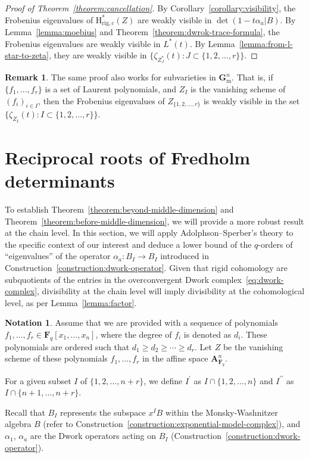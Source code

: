 \documentclass{amsart}
\numberwithin{equation}{section}
\theoremstyle{plain}
\theoremstyle{definition}
\newtheorem{notation}[equation]{Notation}
\newtheorem{remark}[equation]{Remark}
\renewcommand{\mathbb}{\mathbf}
\begin{document}
\begin{proof}[Proof of Theorem~\ref{theorem:cancellation}]
  By Corollary~\ref{corollary:visibility},
  the Frobenius eigenvalues of \(\mathrm{H}^{\ast}_{\mathrm{rig},c}(Z)\)
  are weakly visible in \(\det(1-t\alpha_{a}| B)\).
  By Lemma~\ref{lemma:moebius} and Theorem~\ref{theorem:dwrok-trace-formula},
  the Frobenius eigenvalues are weakly visible in \(L^{\ast}(t)\).
  By Lemma~\ref{lemma:from-l-star-to-zeta},
  they are weakly visible in
  \(\{\zeta_{Z_J^*}(t) : J \subset \{1,2,\ldots,r\}\}\).
\end{proof}

\begin{remark}
  The same proof also works for subvarieties in \(\mathbb{G}_{\mathrm{m}}^{n}\).
  That is, if \(\{f_1,\ldots,f_r\}\) is a set of Laurent polynomials, and
  \(Z_{I}\) is the vanishing scheme of \((f_i)_{i\in I}\),
  then the Frobenius eigenvalues of \(Z_{\{1,2,\ldots,r\}}\) is weakly visible
  in the set \(\{\zeta_{Z_I}(t): I\subset \{1,2,\ldots,r\}\}\).
\end{remark}



\section{Reciprocal roots of Fredholm determinants}
\label{sec:artin-hasse}

To establish Theorem~\ref{theorem:beyond-middle-dimension} and
Theorem~\ref{theorem:before-middle-dimension}, we will provide a more
robust result at the chain level.  In this section, we will apply
Adolphson--Sperber's theory to the specific context of our interest
and deduce a lower bound of the \(q\)-orders of ``eigenvalues'' of the operator
\(\alpha_{a}\colon B_{I} \to B_{I}\) introduced in
Construction~\ref{construction:dwork-operator}.  Given that rigid
cohomology are subquotients of the entries in the overconvergent Dwork
complex~\eqref{eq:dwork-complex}, divisibility at the chain level will
imply divisibility at the cohomological level, as per
Lemma~\ref{lemma:factor}.


\begin{notation}\label{notation}
Assume that we are provided with a sequence of polynomials
\(f_{1},\ldots,f_{r} \in \mathbb{F}_{q}[x_{1},\ldots,x_{n}]\), where
the degree of \(f_{i}\) is denoted as \(d_{i}\).  These polynomials
are ordered such that \(d_{1}\geq d_{2} \geq \cdots \geq d_{r}\).  Let
\(Z\) be the vanishing scheme of these polynomials
\(f_{1},\ldots,f_{r}\) in the affine space
\(\mathbb{A}^{n}_{\mathbb{F}_{q}}\).

For a given subset \(I\) of \(\{1,2,\ldots,n+r\}\), we define
\(I^{\prime}\) as \(I \cap\{1,2,\ldots,n\}\) and \(I^{\prime\prime}\)
as \(I \cap \{n+1,\ldots,n+r\}\).

Recall that \(B_{I}\) represents the subspace \(x^{I}B\) within the
Monsky-Washnitzer algebra \(B\) (refer to
Construction~\ref{construction:exponential-model-complex}),
and \(\alpha_{1}\), \(\alpha_{a}\) are the Dwork operators acting on \(B_{I}\)
(Construction~\ref{construction:dwork-operator}).
\end{notation}
\end{document}
